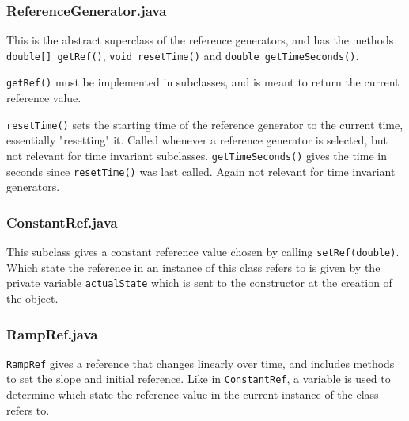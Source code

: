 \subsubsection{ReferenceGenerator.java}
This is the abstract superclass of the reference generators, and has the methods \texttt{double[] getRef()}, \texttt{void resetTime()} and \texttt{double getTimeSeconds()}.

\texttt{getRef()} must be implemented in subclasses, and is meant to return the current reference value.


\texttt{resetTime()} sets the starting time of the reference generator to the current time, essentially "resetting" it. Called whenever a reference generator is selected, but not relevant for time invariant subclasses.
\texttt{getTimeSeconds()} gives the time in seconds since \texttt{resetTime()} was last called. Again not relevant for time invariant generators.

\subsubsection{ConstantRef.java}
This subclass gives a constant reference value chosen by calling \texttt{setRef(double)}. Which state the reference in an instance of this class refers to is given by the private variable \texttt{actualState} which is sent to the constructor at the creation of the object.

%

\subsubsection{RampRef.java}
\texttt{RampRef} gives a reference that changes linearly over time, and includes methods to set the slope and initial reference. Like in \texttt{ConstantRef}, a variable is used to determine which state the reference value in the current instance of the class refers to.

